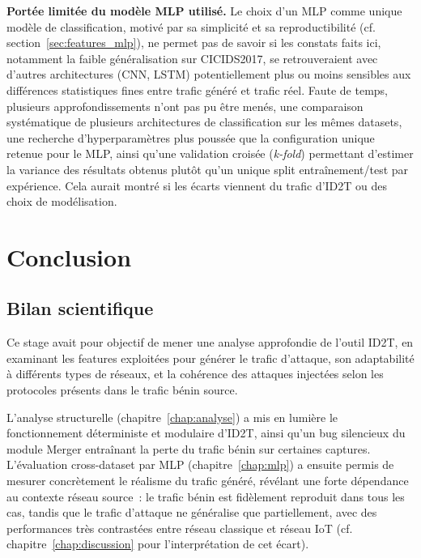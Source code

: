 \documentclass[12pt, a4paper]{report}
\begin{document}
\textbf{Portée limitée du modèle MLP utilisé.} Le choix d'un MLP comme
unique modèle de classification, motivé par sa simplicité et sa
reproductibilité (cf. section~\ref{sec:features_mlp}), ne permet pas
de savoir si les constats faits ici, notamment la faible
généralisation sur CICIDS2017, se retrouveraient avec d'autres
architectures (CNN, LSTM) potentiellement plus ou moins sensibles aux
différences statistiques fines entre trafic généré et trafic réel.
Faute de temps, plusieurs approfondissements n'ont pas pu être menés,
une comparaison systématique de plusieurs architectures de
classification sur les mêmes datasets, une recherche d'hyperparamètres
plus poussée que la configuration unique retenue pour le MLP, ainsi
qu'une validation croisée (\textit{k-fold}) permettant d'estimer la
variance des résultats obtenus plutôt qu'un unique split
entraînement/test par expérience. Cela aurait montré si les écarts viennent du trafic d'ID2T ou des choix de modélisation.
 
 
 
 
 
\chapter{Conclusion}
\label{chap:conclusion}
 
\section{Bilan scientifique}
 
Ce stage avait pour objectif de mener une analyse approfondie de
l'outil ID2T, en examinant les features exploitées pour générer le
trafic d'attaque, son adaptabilité à différents types de réseaux, et
la cohérence des attaques injectées selon les protocoles présents dans
le trafic bénin source.
 
L'analyse structurelle (chapitre~\ref{chap:analyse}) a mis en lumière
le fonctionnement déterministe et modulaire d'ID2T, ainsi qu'un bug
silencieux du module Merger entraînant la perte du trafic bénin sur
certaines captures. L'évaluation cross-dataset par MLP
(chapitre~\ref{chap:mlp}) a ensuite permis de mesurer concrètement
le réalisme du trafic généré, révélant une forte dépendance au
contexte réseau source~: le trafic bénin est fidèlement reproduit dans
tous les cas, tandis que le trafic d'attaque ne généralise que
partiellement, avec des performances très contrastées entre réseau
classique et réseau IoT (cf. chapitre~\ref{chap:discussion} pour
l'interprétation de cet écart).
 
\end{document}
